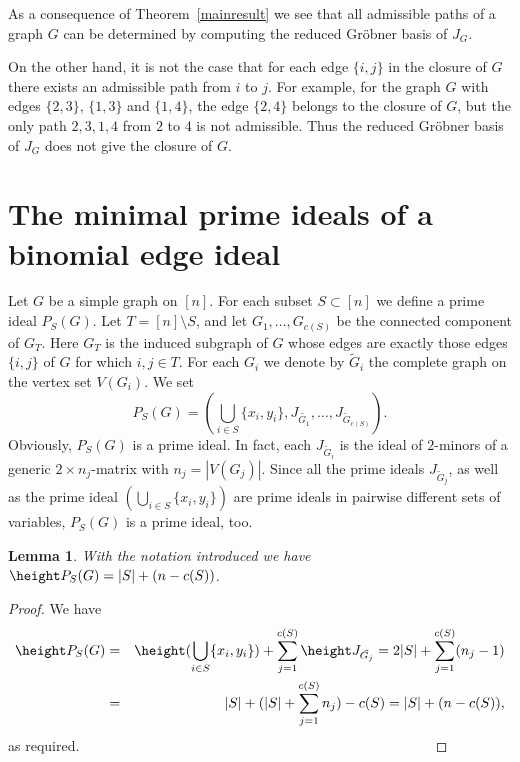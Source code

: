 \documentclass[11pt]{amsart}
\let\Union=\bigcup
\newtheorem{Lemma}[Theorem]{Lemma}
\begin{document}
As a consequence of Theorem~\ref{mainresult}  we see that  all admissible paths of a graph $G$ can be determined by computing the reduced Gr\"obner basis of $J_G$.

On the other hand, it is not the case that for each edge $\{i,j\}$ in the closure of $G$ there exists an admissible path from $i$ to $j$. For example, for the graph $G$  with edges $\{2,3\}$, $\{1,3\}$ and $\{1,4\}$, the edge $\{2,4\}$ belongs to the closure of $G$, but the only path $2,3,1,4$ from $2$ to $4$ is not admissible.
Thus the reduced Gr\"obner basis of $J_G$ does not give the closure of $G$.






\section{The minimal prime ideals of a binomial edge ideal}

Let $G$ be a simple graph on $[n]$. For each subset $S\subset [n]$ we define a prime ideal $P_S(G)$. Let $T=[n]\setminus S$, and let $G_1,\ldots, G_{c(S)}$ be the connected component of $G_T$. Here $G_T$ is the induced subgraph  of $G$  whose edges are exactly those edges $\{i,j\}$ of $G$ for which $i,j\in T$. For each $G_i$ we denote by $\tilde{G}_i$ the complete graph on the vertex set $V(G_i)$. We set
\[
P_S(G)=(\Union_{i\in S}\{x_i,y_i\}, J_{\tilde{G_1}},\ldots, J_{\tilde{G}_{c(S)}}).
\]
Obviously, $P_S(G)$ is a prime ideal. In fact, each $J_{\tilde{G}_i}$ is the ideal of $2$-minors of a  generic $2\times n_j$-matrix with $n_j=|V(G_j)|$. Since all the prime ideals $J_{\tilde{G}_j}$, as well as the prime ideal $(\Union_{i\in S}\{x_i,y_i\})$ are prime ideals in  pairwise different sets of variables,  $P_S(G)$ is a prime ideal, too.

\begin{Lemma}
\label{height}
With the notation introduced we have $\height P_S(G)=|S|+(n-c(S))$.
\end{Lemma}

\begin{proof}
We have
\begin{eqnarray*}
\height P_S(G)&=&\height (\Union_{i\in S}\{x_i,y_i\})+\sum_{j=1}^{c(S)}\height  J_{\tilde{G_j}}=2|S|+\sum_{j=1}^{c(S)}(n_j-1)\\
&=& |S|+(|S|+\sum_{j=1}^{c(S)}n_j) -c(S)=|S|+(n-c(S)),
\end{eqnarray*}
as required.
\, \, \, \, \, \, \, \, \, \,
\, \, \, \, \, \, \, \, \, \,
\, \, \, \, \, \, \, \, \, \,
\, \, \, \, \, \, \, \, \, \,
\, \, \, \, \, \, \, \, \, \,
\end{proof}
\end{document}
